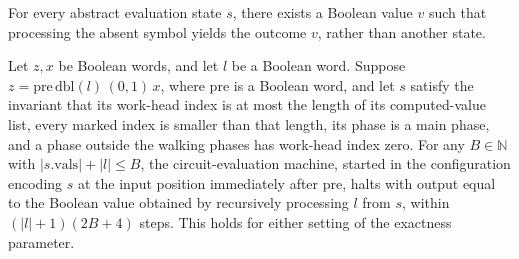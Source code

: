 \begin{theorem}
\label{BoolCircuit.CircuitEval.absStep_none}
\leanok
{}
For every abstract evaluation state $s$, there exists a Boolean value $v$ such that
processing the absent symbol yields the outcome $v$, rather than another state.
\end{theorem}

\begin{theorem}
\label{BoolCircuit.CircuitEval.main_run}
\leanok
{}
Let $z,x$ be Boolean words, and let $l$ be a Boolean word. Suppose
$z=\mathrm{pre}\,\mathrm{dbl}(l)\,(0,1)\,x$, where $\mathrm{pre}$ is a Boolean word, and
let $s$ satisfy the invariant that its work-head index is at most the length of its
computed-value list, every marked index is smaller than that length, its phase is a main
phase, and a phase outside the walking phases has work-head index zero. For any
$B\in\mathbb N$ with $|s.\mathrm{vals}|+|l|\le B$, the circuit-evaluation machine,
started in the configuration encoding $s$ at the input position immediately after
$\mathrm{pre}$, halts with output equal to the Boolean value obtained by recursively
processing $l$ from $s$, within $(|l|+1)(2B+4)$ steps. This holds for either setting of
the exactness parameter.
\end{theorem}
